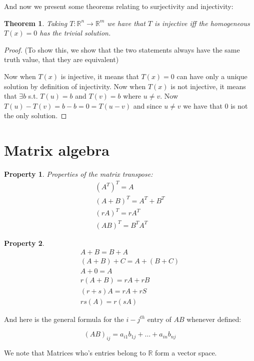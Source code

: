 \documentclass{article}
\newtheorem{thm}{Theorem}[subsection]
\newtheorem{property}{Property}
\numberwithin{equation}{subsection}
\begin{document}
And now we present some theorems relating to surjectivity and injectivity:

\begin{thm}
Taking $T: \mathbb{R}^n \to \mathbb{R}^m$ we have that $T$ is injective iff the homogeneous $T(x) = 0$ has the trivial solution. 
\end{thm}

\begin{proof}(To show this, we show that the two statements always have the same truth value, that they are equivalent)

Now when $T(x)$ is injective, it means that $T(x) = 0$ can have only a unique solution by definition of injectivity. Now when $T(x)$ is not injective, it means that $\exists b$ s.t. $T(u) = b$ and $T(v) = b$ where $u \not = v$. Now $T(u) - T(v) = b-b = 0 = T(u-v)$ and since $u\not=v$ we have that $0$ is not the only solution.
\end{proof}

\section{Matrix algebra}

\begin{property}
Properties of the matrix transpose:
\begin{align*}
    (A^T)^T = A\\
    (A + B)^T = A^T + B^T\\
    (rA)^T = rA^T\\
    (AB)^T = B^TA^T
\end{align*}
\end{property}



\begin{property}
\begin{align*}
    A + B = B + A\\
    (A + B) + C = A + (B + C)\\
    A + 0 = A\\
    r(A + B) = rA + rB\\
    (r+s)A = rA + rS\\
    rs(A) = r(sA)
\end{align*}
\end{property}

And here is the general formula for the $i-j^{th}$ entry of $AB$ whenever defined:

$$(AB)_{ij} = a_{i1}b_{1j} + \ldots + a_{in}b_{nj}$$

\begin{remark}
We note that Matrices who's entries belong to $\mathbb{R}$ form a vector space.
\end{remark}
\end{document}
